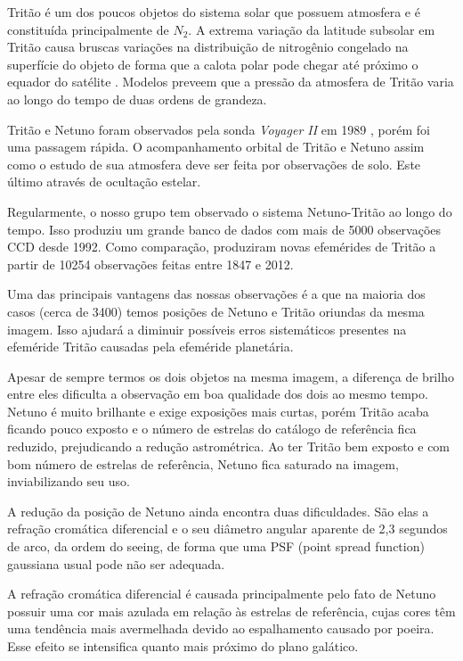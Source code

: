 \documentclass[12pt,a4paper]{report}
\begin{document}
Tritão é um dos poucos objetos do sistema solar que possuem atmosfera e é constituída principalmente de $N_{2}$. A extrema variação da latitude subsolar em Tritão causa bruscas variações na distribuição de nitrogênio congelado na superfície do objeto de forma que a calota polar pode chegar até próximo o equador do satélite \citep{Hansen1992}. Modelos preveem que a pressão da atmosfera de Tritão varia ao longo do tempo de duas ordens de grandeza.

Tritão e Netuno foram observados pela sonda \textit{Voyager II} em 1989 \citep{Smith1989}, porém foi uma passagem rápida. O acompanhamento orbital de Tritão e Netuno assim como o estudo de sua atmosfera deve ser feita por observações de solo. Este último através de ocultação estelar.

Regularmente, o nosso grupo tem observado o sistema Netuno-Tritão ao longo do tempo. Isso produziu um grande banco de dados com mais de 5000 observações CCD desde 1992. Como comparação, \cite{Emelyanov2015} produziram novas efemérides de Tritão a partir de 10254 observações feitas entre 1847 e 2012.

Uma das principais vantagens das nossas observações é a que na maioria dos casos (cerca de 3400) temos posições de Netuno e Tritão oriundas da mesma imagem. Isso ajudará a diminuir possíveis erros sistemáticos presentes na efeméride Tritão causadas pela efeméride planetária.

Apesar de sempre termos os dois objetos na mesma imagem, a diferença de brilho entre eles dificulta a observação em boa qualidade dos dois ao mesmo tempo. Netuno é muito brilhante e exige exposições mais curtas, porém Tritão acaba ficando pouco exposto e o número de estrelas do catálogo de referência fica reduzido, prejudicando a redução astrométrica. Ao ter Tritão bem exposto e com bom número de estrelas de referência, Netuno fica saturado na imagem, inviabilizando seu uso.

A redução da posição de Netuno ainda encontra duas dificuldades. São elas a refração cromática diferencial e o seu diâmetro angular aparente de 2,3 segundos de arco, da ordem do seeing, de forma que uma PSF (point spread function) gaussiana usual pode não ser adequada.

A refração cromática diferencial é causada principalmente pelo fato de Netuno possuir uma cor mais azulada em relação às estrelas de referência, cujas cores têm uma tendência mais avermelhada devido ao espalhamento causado por poeira. Esse efeito se intensifica quanto mais próximo do plano galático.
\end{document}
